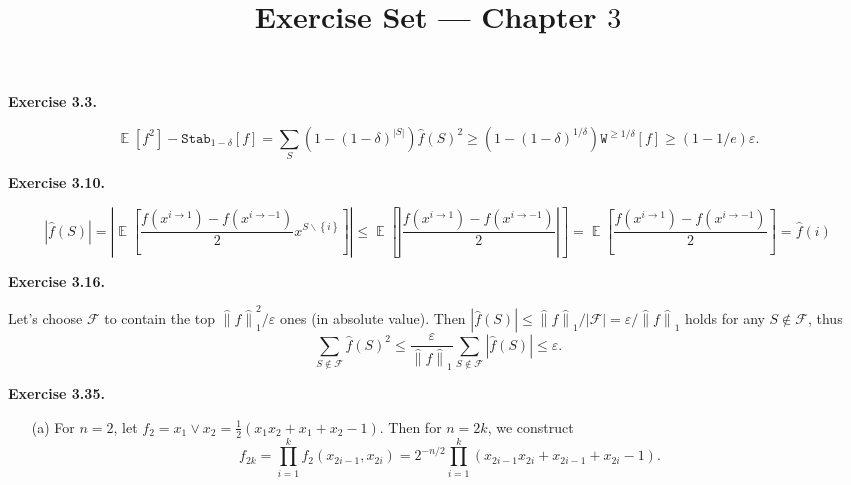 \documentclass[a4paper]{article}
\title{Exercise Set --- Chapter $3$}
\date{}
\newenvironment{exercise}[1]{
	\par
	\noindent\textbf{Exercise #1.}\quad
}{
	\par
	\bigskip
}
\DeclareMathOperator{\E}{\mathbb E}
\newcommand{\eps}{\varepsilon}
\newcommand{\abs}[1]{{\left| #1 \right|}}
\newcommand{\hvabs}[1]{{\hat{\|} #1 \hat{\|}}}
\newcommand{\pbra}[1]{{\left( #1 \right)}}
\newcommand{\cbra}[1]{{\left\{ #1 \right\}}}
\newcommand{\sbra}[1]{{\left[ #1 \right]}}
\newcommand{\Fcal}{\mathcal{F}}
\newcommand{\Wtt}{\mathtt{W}}
\newcommand{\Stab}{\mathtt{Stab}}
\begin{document}
\maketitle

\begin{exercise}{3.3}
    $$
    \E[f^2]-\Stab_{1-\delta}[f]=\sum_S(1-(1-\delta)^{|S|})\hat f(S)^2\geq(1-(1-\delta)^{1/\delta})\Wtt^{\geq1/\delta}[f]
    \geq(1-1/e)\eps.
    $$
\end{exercise}

\begin{exercise}{3.10}
    $$
    \abs{\hat f(S)}
    =\abs{\E\sbra{\frac{f(x^{i\to1})-f(x^{i\to-1})}2x^{S\backslash\cbra{i}}}}
    \leq\E\sbra{\abs{\frac{f(x^{i\to1})-f(x^{i\to-1})}2}}
    =\E\sbra{\frac{f(x^{i\to1})-f(x^{i\to-1})}2}
    =\hat f(i)
    $$
\end{exercise}

\begin{exercise}{3.16}
    Let's choose $\Fcal$ to contain the top $\hvabs{f}_1^2/\eps$ ones (in absolute value). 
    Then $\abs{\hat f(S)}\leq\hvabs{f}_1/|\Fcal|=\eps/\hvabs{f}_1$ holds for any $S\notin\Fcal$, thus
    $$
    \sum_{S\notin\Fcal}\hat f(S)^2\leq\frac\eps{\hvabs{f}_1}\sum_{S\notin\Fcal}\abs{\hat f(S)}\leq\eps.
    $$
\end{exercise}

\begin{exercise}{3.35}
    \begin{itemize}
        \item[(a)] For $n=2$, let $f_2=x_1\lor x_2=\frac12\pbra{x_1x_2+x_1+x_2-1}$. Then for $n=2k$, we construct
            $$
            f_{2k}=\prod_{i=1}^kf_2(x_{2i-1},x_{2i})
            =2^{-n/2}\prod_{i=1}^k\pbra{x_{2i-1}x_{2i}+x_{2i-1}+x_{2i}-1}.
            $$
    \end{itemize}
\end{exercise}
\end{document}
